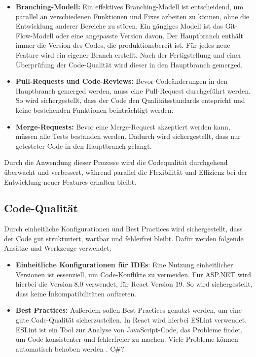 \documentclass[a4paper,12pt]{article}
\begin{document}
\begin{itemize}
    \item \textbf{Branching-Modell:} Ein effektives Branching-Modell ist entscheidend, um parallel an verschiedenen Funktionen und Fixes arbeiten zu können, ohne die Entwicklung anderer Bereiche zu stören. Ein gängiges Modell ist das Git-Flow-Modell oder eine angepasste Version davon. Der Hauptbranch enthält immer die Version des Codes, die produktionsbereit ist. Für jedes neue Feature wird ein eigener Branch erstellt. Nach der Fertigstellung und einer Überprüfung der Code-Qualität wird dieser in den Hauptbranch gemerged.
    \item \textbf{Pull-Requests und Code-Reviews:} Bevor Codeänderungen in den Hauptbranch gemerged werden, muss eine Pull-Request durchgeführt werden. So wird sichergestellt, dass der Code den Qualitätsstandards entspricht und keine bestehenden Funktionen beinträchtigt werden.
    \item \textbf{Merge-Requests:} Bevor eine Merge-Request akzeptiert werden kann, müssen alle Tests bestanden werden. Dadurch wird sichergestellt, dass nur getesteter Code in den Hauptbranch gelangt.
\end{itemize}

Durch die Anwendung dieser Prozesse wird die Codequalität durchgehend überwacht und verbessert, während parallel die Flexibilität und Effizienz bei der Entwicklung neuer Features erhalten bleibt.

\subsection{Code-Qualität}
Durch einheitliche Konfigurationen und Best Practices wird sichergestellt, dass der Code gut strukturiert, wartbar und fehlerfrei bleibt. Dafür werden folgende Ansätze und Werkzeuge verwendet:

\begin{itemize}
    \item \textbf{Einheitliche Konfigurationen für IDEs}: Eine Nutzung einheitlicher Versionen ist essenziell, um Code-Konflikte zu vermeiden. Für \mbox{ASP.NET} wird hierbei die Version 8.0 verwendet, für React Version 19. So wird sichergestellt, dass keine Inkompatibilitäten auftreten.
    \item \textbf{Best Practices:} Außerdem sollen Best Practices genutzt werden, um eine gute Code-Qualität sicherzustellen. In React wird hierbei ESLint verwendet. ESLint ist ein Tool zur Analyse von JavaScript-Code, das Probleme findet, um Code konsistenter und fehlerfreier zu machen. Viele Probleme können automatisch behoben werden \cite{eslint_find_2025}. C\#?
\end{itemize}
\end{document}
